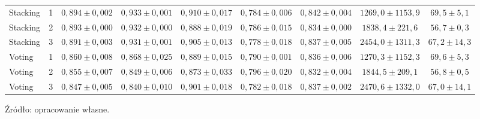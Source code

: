 \begin{table}[H]
{\begin{tabular}{llccccccc}
Stacking & 1 & $0{,}894 \pm 0{,}002$ & $0{,}933 \pm 0{,}001$ & $0{,}910 \pm 0{,}017$ & $0{,}784 \pm 0{,}006$ & $0{,}842 \pm 0{,}004$ & $1269{,}0 \pm 1153{,}9$ & $69{,}5 \pm 5{,}1$ \\
Stacking & 2 & $0{,}893 \pm 0{,}000$ & $0{,}932 \pm 0{,}000$ & $0{,}888 \pm 0{,}019$ & $0{,}786 \pm 0{,}015$ & $0{,}834 \pm 0{,}000$ & $1838{,}4 \pm 221{,}6$ & $56{,}7 \pm 0{,}3$ \\
Stacking & 3 & $0{,}891 \pm 0{,}003$ & $0{,}931 \pm 0{,}001$ & $0{,}905 \pm 0{,}013$ & $0{,}778 \pm 0{,}018$ & $0{,}837 \pm 0{,}005$ & $2454{,}0 \pm 1311{,}3$ & $67{,}2 \pm 14{,}3$ \\
Voting & 1 & $0{,}860 \pm 0{,}008$ & $0{,}868 \pm 0{,}025$ & $0{,}889 \pm 0{,}015$ & $0{,}790 \pm 0{,}001$ & $0{,}836 \pm 0{,}006$ & $1270{,}3 \pm 1152{,}3$ & $69{,}6 \pm 5{,}3$ \\
Voting & 2 & $0{,}855 \pm 0{,}007$ & $0{,}849 \pm 0{,}006$ & $0{,}873 \pm 0{,}033$ & $0{,}796 \pm 0{,}020$ & $0{,}832 \pm 0{,}004$ & $1844{,}5 \pm 209{,}1$ & $56{,}8 \pm 0{,}5$ \\
Voting & 3 & $0{,}847 \pm 0{,}005$ & $0{,}840 \pm 0{,}010$ & $0{,}901 \pm 0{,}018$ & $0{,}782 \pm 0{,}018$ & $0{,}837 \pm 0{,}002$ & $2470{,}6 \pm 1332{,}0$ & $67{,}0 \pm 14{,}1$ \\
\hline
\end{tabular}}
\end{table}

Źródło: opracowanie własne.